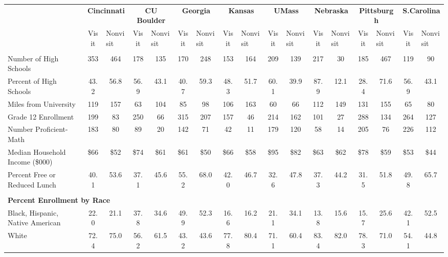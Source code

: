 \begin{tabular*}{\linewidth}{@{\extracolsep{\fill} } lcccccccccccccccc}%
&\multicolumn{2}{c}{\bfseries Cincinnati}&\multicolumn{2}{c}{\bfseries CU Boulder}&\multicolumn{2}{c}{\bfseries Georgia}&\multicolumn{2}{c}{\bfseries Kansas}&\multicolumn{2}{c}{\bfseries UMass}&\multicolumn{2}{c}{\bfseries Nebraska}&\multicolumn{2}{c}{\bfseries Pittsburgh}&\multicolumn{2}{c}{\bfseries S.Carolina}\\%
&Visit&\multicolumn{1}{l}{Nonvisit}&Visit&\multicolumn{1}{l}{Nonvisit}&Visit&\multicolumn{1}{l}{Nonvisit}&Visit&\multicolumn{1}{l}{Nonvisit}&Visit&\multicolumn{1}{l}{Nonvisit}&Visit&\multicolumn{1}{l}{Nonvisit}&Visit&\multicolumn{1}{l}{Nonvisit}&Visit&\multicolumn{1}{l}{Nonvisit}\\%
\hline%
&&&&&&&&&&&&&&&&\\%
\hspace{0cm}Number of High Schools&353&464&178&135&170&248&153&164&209&139&217&30&185&467&119&90\\%
Percent of High Schools&43.2&56.8&56.9&43.1&40.7&59.3&48.3&51.7&60.1&39.9&87.9&12.1&28.4&71.6&56.9&43.1\\%
\hspace{0cm}Miles from University&119&157&63&104&85&98&106&163&60&66&112&149&131&155&65&80\\%
\hspace{0cm}Grade 12 Enrollment&199&83&250&66&315&207&157&46&214&162&101&27&288&134&264&127\\%
\hspace{0cm}Number Proficient{-}Math&183&80&89&20&142&71&42&11&179&120&58&14&205&76&226&112\\%
\hspace{0cm}Median Household Income (\$000)&\$66&\$52&\$74&\$61&\$61&\$50&\$66&\$58&\$95&\$82&\$63&\$62&\$78&\$59&\$53&\$44\\%
\hspace{0cm}Percent Free or Reduced Lunch&40.1&53.6&37.1&45.6&55.2&68.0&42.0&46.7&32.6&47.8&37.3&44.2&31.5&51.8&49.8&65.7\\%
&&&&&&&&&&&&&&&&\\%
\multicolumn{17}{l}{\bfseries Percent Enrollment by Race}\\%
\hspace{0.2cm}Black, Hispanic, Native American&22.0&21.1&37.8&34.6&49.9&52.3&16.6&16.2&21.1&34.1&13.8&15.6&15.7&25.6&42.1&52.5\\%
\hspace{0.2cm}White&72.4&75.0&56.2&61.5&43.2&43.6&77.8&80.4&71.1&60.4&83.4&82.0&78.3&71.0&54.1&44.8\\%

\end{tabular*}

